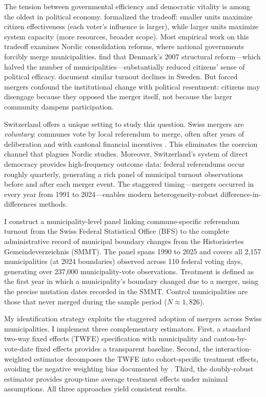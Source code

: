 \documentclass[12pt]{article}
\begin{document}
The tension between governmental efficiency and democratic vitality is among the oldest in political economy. \citet{dahltufte1973} formalized the tradeoff: smaller units maximize citizen effectiveness (each voter's influence is larger), while larger units maximize system capacity (more resources, broader scope). Most empirical work on this tradeoff examines Nordic consolidation reforms, where national governments forcibly merge municipalities. \citet{lassen2011jurisdictional} find that Denmark's 2007 structural reform---which halved the number of municipalities---substantially reduced citizens' sense of political efficacy. \citet{koch2013political} document similar turnout declines in Sweden. But forced mergers confound the institutional change with political resentment: citizens may disengage because they opposed the merger itself, not because the larger community dampens participation.

Switzerland offers a unique setting to study this question. Swiss mergers are \textit{voluntary}: communes vote by local referendum to merge, often after years of deliberation and with cantonal financial incentives \citep{steiner2003gemeindezusammenschluesse, ladner2016handbuch}. This eliminates the coercion channel that plagues Nordic studies. Moreover, Switzerland's system of direct democracy provides high-frequency outcome data: federal referendums occur roughly quarterly, generating a rich panel of municipal turnout observations before and after each merger event. The staggered timing---mergers occurred in every year from 1991 to 2024---enables modern heterogeneity-robust difference-in-differences methods.

I construct a municipality-level panel linking commune-specific referendum turnout from the Swiss Federal Statistical Office (BFS) to the complete administrative record of municipal boundary changes from the Historisiertes Gemeindeverzeichnis (SMMT). The panel spans 1990 to 2025 and covers all 2,157 municipalities (at 2024 boundaries) observed across 110 federal voting days, generating over 237,000 municipality-vote observations. Treatment is defined as the first year in which a municipality's boundary changed due to a merger, using the precise mutation dates recorded in the SMMT. Control municipalities are those that never merged during the sample period ($N \approx 1,826$).

My identification strategy exploits the staggered adoption of mergers across Swiss municipalities. I implement three complementary estimators. First, a standard two-way fixed effects (TWFE) specification with municipality and canton-by-vote-date fixed effects provides a transparent baseline. Second, the \citet{sunandabraham2021} interaction-weighted estimator decomposes the TWFE into cohort-specific treatment effects, avoiding the negative weighting bias documented by \citet{goodmanbacon2021difference}. Third, the \citet{callaway2021difference} doubly-robust estimator provides group-time average treatment effects under minimal assumptions. All three approaches yield consistent results.
\end{document}
